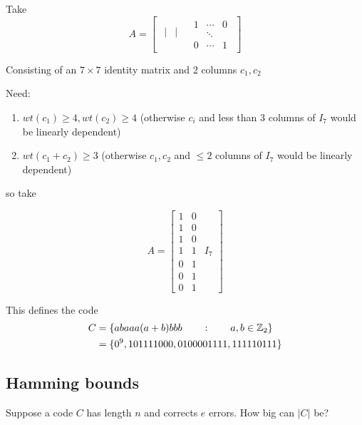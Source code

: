 \documentclass[]{article}
\theoremstyle{definition}
\theoremstyle{remark}
\numberwithin{equation}{section}
\begin{document}
			Take
			\begin{equation*}
				A = \begin{bmatrix}
					\begin{matrix}
					| & | & \\
					\end{matrix}

					\begin{matrix}
					1 & \cdots & 0 \\
					  & \ddots & \\
					0 & \cdots & 1
					\end{matrix}
					\end{bmatrix}
			\end{equation*}

			Consisting of an $7 \times 7$ identity matrix and 2 columns $c_1, c_2$

			Need:
			\begin{enumerate}
				\item $wt(c_1)\geq 4, wt(c_2)\geq 4$ (otherwise $c_i$ and less than 3 columns of $I_7$ would be linearly dependent)
				\item $wt(c_1+ c_2) \geq 3$ (otherwise $c_1, c_2$ and $\leq 2$ columns of $I_7$ would be linearly dependent)	
			\end{enumerate}
			so take 

			\begin{equation*}
				A = \begin{bmatrix}
					1 & 0 \\
					1 & 0 \\
					1 & 0 \\
					1 & 1 & I_7 \\
					0 & 1 \\
					0 & 1 \\
					0 & 1 

					\end{bmatrix}
			\end{equation*}

			This defines the code
			\begin{align*}
				C &= \{ a b a a a (a +b)  b b b \qquad: \qquad a,b \in \mathbb{Z}_2 \} \\
				  &= \{0^9, 101111000, 0100001111, 111110111\}
			\end{align*}
	\subsection{Hamming bounds}

		Suppose a code $C$ has length $n$ and corrects $e$ errors. How big can $|C|$ be?\\
\end{document}
